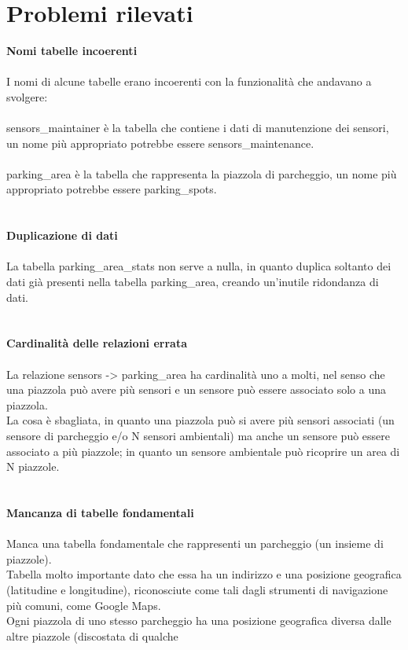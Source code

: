 \section{Problemi rilevati}
\textbf{Nomi tabelle incoerenti}
\\\\
I nomi di alcune tabelle erano incoerenti con la funzionalità che andavano a svolgere:
\\\\
sensors\_maintainer è la tabella che contiene i dati di manutenzione dei sensori, un 
nome più appropriato potrebbe essere sensors\_maintenance.
\\\\
parking\_area è la tabella che rappresenta la piazzola di parcheggio, un nome più appropriato
potrebbe essere parking\_spots.
\\\\\\
\textbf{Duplicazione di dati}
\\\\
La tabella parking\_area\_stats non serve a nulla, in quanto duplica soltanto dei dati già presenti
nella tabella parking\_area, creando un'inutile ridondanza di dati.
\\\\\\
\textbf{Cardinalità delle relazioni errata}
\\\\
La relazione sensors -> parking\_area ha cardinalità uno a molti, nel senso che una piazzola può avere
più sensori e un sensore può essere associato solo a una piazzola. 
\\
La cosa è sbagliata, in quanto una piazzola può si avere più sensori associati (un sensore di parcheggio e/o N
sensori ambientali) ma anche un sensore può essere associato a più piazzole; in quanto un sensore ambientale
può ricoprire un area di N piazzole.
\\\\\\
\textbf{Mancanza di tabelle fondamentali}
\\\\
Manca una tabella fondamentale che rappresenti un parcheggio (un insieme di piazzole). 
\\
Tabella molto importante dato che essa ha un indirizzo e una posizione geografica (latitudine e longitudine), 
riconosciute come tali dagli strumenti di navigazione più comuni, come Google Maps. 
\\
Ogni piazzola di uno stesso parcheggio ha una posizione geografica diversa dalle altre piazzole (discostata di qualche 
